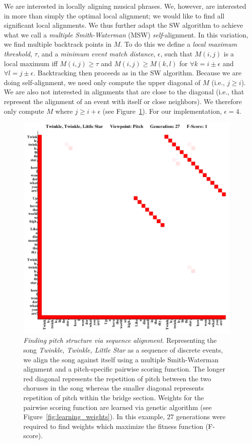\documentclass[phd,electronic,oneside,twosidetoc,letterpaper,chaptercenter,parttop,lof,lot]{byumsphd}
\begin{document}
We are interested in locally aligning musical phrases. We, however, are interested in more than simply the optimal local alignment; we would like to find all significant local alignments. We thus further adapt the SW algorithm to achieve what we call a \textit{multiple Smith-Waterman} (MSW) \textit{self}-alignment. In this variation, we find multiple backtrack points in $M$. To do this we define a \textit{local maximum threshold}, $\tau$, and a \textit{minimum event match distance}, $\epsilon$, such that $M(i,j)$ is a local maximum iff $M(i,j) \geq \tau$ and $M(i,j) \geq M(k,l)$ for $\forall k = i\pm\epsilon$ and $\forall l = j\pm\epsilon$. Backtracking then proceeds as in the SW algorithm. Because we are doing self-alignment, we need only compute the upper diagonal of $M$ (i.e., $j \geq i$). We are also not interested in alignments that are close to the diagonal (i.e., that represent the alignment of an event with itself or close neighbors). We therefore only compute $M$ where $j \geq i + \epsilon$ (see Figure~\ref{fig:alignment_example}). For our implementation, $\epsilon = 4$.

\begin{figure}
\centering
	\includegraphics[width=.7\linewidth]{Twinkle__Twinkle__Little_Star_gen27_id137_pitch}

    \caption{\label{fig:alignment_example}\textit{Finding pitch structure via sequence alignment}. Representing the song \textit{Twinkle, Twinkle, Little Star} as a sequence of discrete events, we align the song against itself using a multiple Smith-Waterman alignment and a pitch-specific pairwise scoring function. The longer red diagonal represents the repetition of pitch between the two choruses in the song whereas the smaller diagonal represents repetition of pitch within the bridge section. Weights for the pairwise scoring function are learned via genetic algorithm (see Figure~\ref{fig:learning_weights}). In this example, 27 generations were required to find weights which maximize the fitness function (F-score).}
\end{figure}
\end{document}
